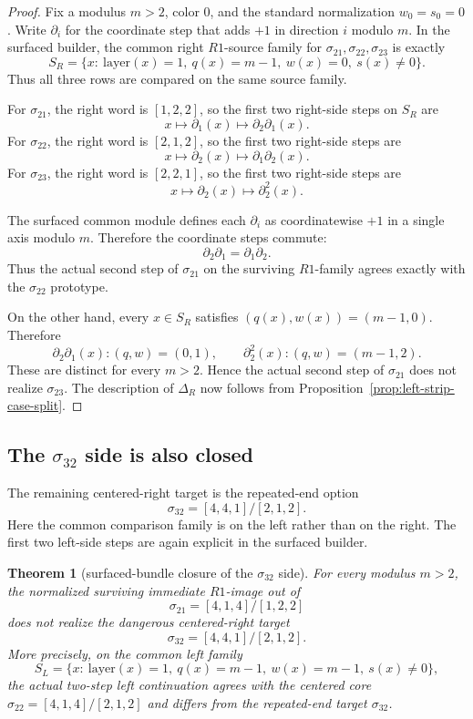 \documentclass[11pt]{article}
\newtheorem{theorem}{Theorem}[section]
\newcommand{\sig}[2]{\sigma_{#1#2}}
\begin{document}
\begin{proof}
Fix a modulus \(m>2\), color \(0\), and the standard normalization
\(w_0=s_0=0\).
Write \(\partial_i\) for the coordinate step that adds \(+1\) in direction
\(i\) modulo \(m\).
In the surfaced builder, the common right \(R1\)-source family for
\(\sig21,\sig22,\sig23\) is exactly
\[
S_R=\{x:\ \mathrm{layer}(x)=1,\ q(x)=m-1,\ w(x)=0,\ s(x)\neq 0\}.
\]
Thus all three rows are compared on the same source family.

For \(\sig21\), the right word is \([1,2,2]\), so the first two right-side
steps on \(S_R\) are
\[
x\mapsto \partial_1(x)\mapsto \partial_2\partial_1(x).
\]
For \(\sig22\), the right word is \([2,1,2]\), so the first two right-side
steps are
\[
x\mapsto \partial_2(x)\mapsto \partial_1\partial_2(x).
\]
For \(\sig23\), the right word is \([2,2,1]\), so the first two right-side
steps are
\[
x\mapsto \partial_2(x)\mapsto \partial_2^2(x).
\]

The surfaced common module defines each \(\partial_i\) as coordinatewise
\(+1\) in a single axis modulo \(m\).  Therefore the coordinate steps
commute:
\[
\partial_2\partial_1=\partial_1\partial_2.
\]
Thus the actual second step of \(\sig21\) on the surviving \(R1\)-family agrees
exactly with the \(\sig22\) prototype.

On the other hand, every \(x\in S_R\) satisfies \((q(x),w(x))=(m-1,0)\).
Therefore
\[
\partial_2\partial_1(x):(q,w)=(0,1),\qquad
\partial_2^2(x):(q,w)=(m-1,2).
\]
These are distinct for every \(m>2\).  Hence the actual second step of
\(\sig21\) does not realize \(\sig23\).
The description of \(\Delta_R\) now follows from
Proposition~\ref{prop:left-strip-case-split}.
\end{proof}

\subsection{The \texorpdfstring{$\sig32$}{sigma32} side is also closed}

The remaining centered-right target is the repeated-end option
\[
\sig32=[4,4,1]/[2,1,2].
\]
Here the common comparison family is on the left rather than on the right.
The first two left-side steps are again explicit in the surfaced builder.

\begin{theorem}[surfaced-bundle closure of the \(\sig32\) side]
\label{thm:sigma32-closed}
For every modulus \(m>2\), the normalized surviving immediate \(R1\)-image out
of
\[
\sig21=[4,1,4]/[1,2,2]
\]
does not realize the dangerous centered-right target
\[
\sig32=[4,4,1]/[2,1,2].
\]
More precisely, on the common left family
\[
S_L=\{x:\ \mathrm{layer}(x)=1,\ q(x)=m-1,\ w(x)=m-1,\ s(x)\neq 0\},
\]
the actual two-step left continuation agrees with the centered core
\(\sig22=[4,1,4]/[2,1,2]\) and differs from the repeated-end target
\(\sig32\).
\end{theorem}
\end{document}
